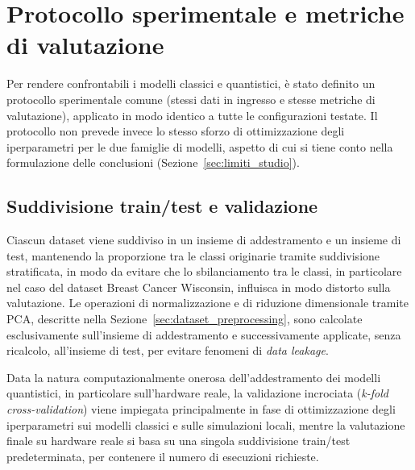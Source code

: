 \section{Protocollo sperimentale e metriche di valutazione}
\label{sec:protocollo_sperimentale}

Per rendere confrontabili i modelli classici e quantistici, è stato definito un protocollo sperimentale comune (stessi dati in ingresso e stesse metriche di valutazione), applicato in modo identico a tutte le configurazioni testate. Il protocollo non prevede invece lo stesso sforzo di ottimizzazione degli iperparametri per le due famiglie di modelli, aspetto di cui si tiene conto nella formulazione delle conclusioni (Sezione~\ref{sec:limiti_studio}).

\subsection{Suddivisione train/test e validazione}
Ciascun dataset viene suddiviso in un insieme di addestramento e un insieme di test, mantenendo la proporzione tra le classi originarie tramite suddivisione stratificata, in modo da evitare che lo sbilanciamento tra le classi, in particolare nel caso del dataset Breast Cancer Wisconsin, influisca in modo distorto sulla valutazione. Le operazioni di normalizzazione e di riduzione dimensionale tramite PCA, descritte nella Sezione~\ref{sec:dataset_preprocessing}, sono calcolate esclusivamente sull'insieme di addestramento e successivamente applicate, senza ricalcolo, all'insieme di test, per evitare fenomeni di \textit{data leakage}.

Data la natura computazionalmente onerosa dell'addestramento dei modelli quantistici, in particolare sull'hardware reale, la validazione incrociata (\textit{k-fold cross-validation}) viene impiegata principalmente in fase di ottimizzazione degli iperparametri sui modelli classici e sulle simulazioni locali, mentre la valutazione finale su hardware reale si basa su una singola suddivisione train/test predeterminata, per contenere il numero di esecuzioni richieste.

